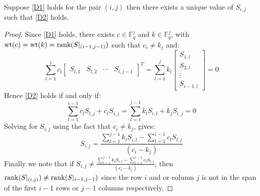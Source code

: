 \begin{lemma}\label{lem:unique_value_for_D2}
  Suppose \ref{D1} holds for the pair $(i, j)$ then there exists a unique value of $S_{i, j}$ such that \ref{D2} holds.
\end{lemma}
\begin{proof}
  Since \ref{D1} holds, there exists $c \in \mathbb{F}_q^{j}$ and $k \in \mathbb{F}_q^{j}$, with $\mathrm{wt}(c) = \mathrm{wt}(k) = \textnormal{rank}(S |_{(i - 1, j - 1)})$ such that $c_i \neq k_j$ and:
  \begin{equation*}
    \sum_{l = 1}^i c_l \begin{bmatrix} S_{l, 1} & S_{l, 2} & \cdots & S_{l, j - 1} \end{bmatrix}^T = \sum_{l = 1}^j k_l \begin{bmatrix} S_{1, l} \\ S_{2, l} \\ \vdots \\ S_{i - 1, l} \end{bmatrix} = 0
  \end{equation*}
  Hence \ref{D2} holds if and only if:
  \begin{equation*}
    \sum_{l = 1}^{i - 1} c_{l} S_{l, j} + c_i S_{i, j} = \sum_{l = 1}^{j - 1} k_l S_{i, l} + k_j S_{i, j} = 0
  \end{equation*}
  Solving for $S_{i, j}$ using the fact that $c_i \neq k_j$, gives:
  \begin{equation*}
    S_{i,j} = \frac{\sum_{l = 1}^{j - 1} k_l S_{i, l} - \sum_{l = 1}^{i - 1} c_{l} S_{l, j}}{(c_i - k_j)}
  \end{equation*}
  Finally we note that if $S_{i,j} \neq \frac{\sum_{l = 1}^{j - 1} k_l S_{i, l} - \sum_{l = 1}^{i - 1} c_{l} S_{l, j}}{(c_i - k_j)}$, then $\textnormal{rank}(S \vert_{(i, j)}) \neq \textnormal{rank}(S \vert_{i - 1, j - 1})$ since the row $i$ and or column $j$ is not in the span of the first $i - 1$ rows or $j - 1$ columns respectively.
\end{proof}

